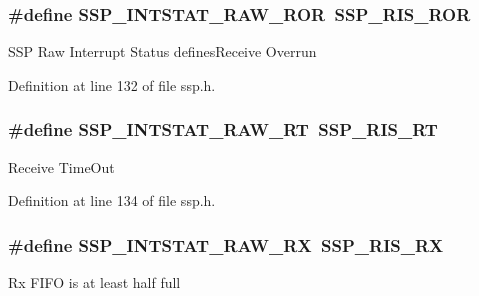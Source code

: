 \subsubsection[{\texorpdfstring{S\+S\+P\+\_\+\+I\+N\+T\+S\+T\+A\+T\+\_\+\+R\+A\+W\+\_\+\+R\+OR}{SSP_INTSTAT_RAW_ROR}}]{\setlength{\rightskip}{0pt plus 5cm}\#define S\+S\+P\+\_\+\+I\+N\+T\+S\+T\+A\+T\+\_\+\+R\+A\+W\+\_\+\+R\+OR~{\bf S\+S\+P\+\_\+\+R\+I\+S\+\_\+\+R\+OR}}\hypertarget{group___s_s_p___public___macros_gafee0d65700b9a2ef6e508755bfacb32e}{}\label{group___s_s_p___public___macros_gafee0d65700b9a2ef6e508755bfacb32e}
S\+SP Raw Interrupt Status defines\+Receive Overrun 

Definition at line 132 of file ssp.\+h.

\subsubsection[{\texorpdfstring{S\+S\+P\+\_\+\+I\+N\+T\+S\+T\+A\+T\+\_\+\+R\+A\+W\+\_\+\+RT}{SSP_INTSTAT_RAW_RT}}]{\setlength{\rightskip}{0pt plus 5cm}\#define S\+S\+P\+\_\+\+I\+N\+T\+S\+T\+A\+T\+\_\+\+R\+A\+W\+\_\+\+RT~{\bf S\+S\+P\+\_\+\+R\+I\+S\+\_\+\+RT}}\hypertarget{group___s_s_p___public___macros_gaa7d981043c996b7721a7c729d0c065df}{}\label{group___s_s_p___public___macros_gaa7d981043c996b7721a7c729d0c065df}
Receive Time\+Out 

Definition at line 134 of file ssp.\+h.

\subsubsection[{\texorpdfstring{S\+S\+P\+\_\+\+I\+N\+T\+S\+T\+A\+T\+\_\+\+R\+A\+W\+\_\+\+RX}{SSP_INTSTAT_RAW_RX}}]{\setlength{\rightskip}{0pt plus 5cm}\#define S\+S\+P\+\_\+\+I\+N\+T\+S\+T\+A\+T\+\_\+\+R\+A\+W\+\_\+\+RX~{\bf S\+S\+P\+\_\+\+R\+I\+S\+\_\+\+RX}}\hypertarget{group___s_s_p___public___macros_gaf52e1a3479fa4d119a298302ca1a3e9e}{}\label{group___s_s_p___public___macros_gaf52e1a3479fa4d119a298302ca1a3e9e}
Rx F\+I\+FO is at least half full 

